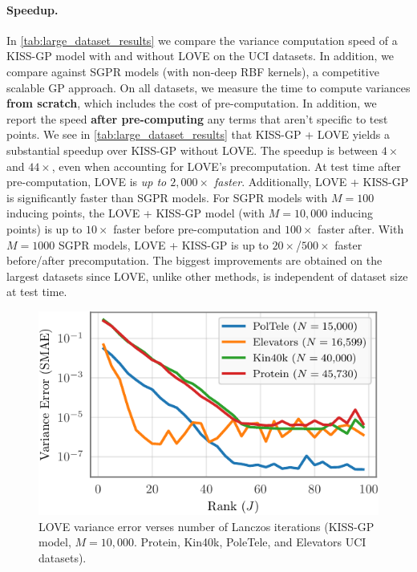\paragraph{Speedup.}
In \cref{tab:large_dataset_results} we compare the variance computation speed of a KISS-GP model with and without LOVE{} on the UCI datasets.
In addition, we compare against SGPR models (with non-deep RBF kernels), a competitive scalable GP approach.
On all datasets, we measure the time to compute variances {\bf from scratch}, which includes the cost of pre-computation.
In addition, we report the speed {\bf after pre-computing} any terms that aren't specific to test points.
We see in \cref{tab:large_dataset_results} that KISS-GP + LOVE{} yields a substantial speedup over KISS-GP without LOVE{}.
The speedup is between $4\times$ and $44\times$, even when accounting for LOVE{}'s precomputation.
At test time after pre-computation, LOVE{} is \emph{up to $2,\!000\times$ faster}.
Additionally, LOVE + KISS-GP{} is significantly faster than SGPR models.
For SGPR models with $M=100$ inducing points, the LOVE + KISS-GP{} model (with $M=10,\!000$ inducing points) is up to $10\times$ faster before pre-computation and $100\times$ faster after.
With $M=1000$ SGPR models, LOVE + KISS-GP{} is up to $20\times$/$500\times$ faster before/after precomputation.
The biggest improvements are obtained on the largest datasets since LOVE{}, unlike other methods, is independent of dataset size at test time.

\begin{figure}[t!]
  \centering
  \includegraphics[width=0.65\columnwidth]{figures/lanczos_accuracy.pdf}
  \vspace{-2ex}
  \caption[LOVE variance error verses number of Lanczos iterations.]{
    LOVE variance error verses number of Lanczos iterations
    (KISS-GP model, $M=10,\!000$. Protein, Kin40k, PoleTele, and Elevators UCI datasets).
    \label{fig:lanczos_accuracy}
  }
  \vspace{-1ex}
\end{figure}

